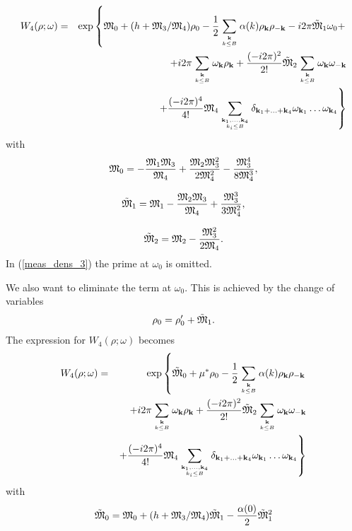 \begin{eqnarray}
	\label{meas_dens_3}
	W_4(\rho;\omega) &=& \exp \left\{\frak M_0 + (h + \frak M_3/\frak M_4)\rho_0
	- \frac12  \sum\limits_{{\vb k}\atop k\le B} \alpha(k) \rho_{\vb k} \rho_{-{\vb k}}
	- i2\pi \tilde{\frak M}_1 \omega_0 + \right.  \nonumber\\
	&&
	+ i2\pi \sum\limits_{{\vb k} \atop k\le B} \omega_{\vb k} \rho_{\vb k}
	+ \frac{(-i2\pi)^2}{2!}\tilde{\frak M}_2 \sum\limits_{{\vb k} \atop k\le B} \omega_{\vb k} \omega_{-\vb k}
	\nonumber\\
	&& \left. +
	\frac{(-i2\pi)^4}{4!} 
	{\frak M}_4
	\sum\limits_{\vb{k}_1,\dotsc,\vb{k}_4\atop{k_i \le B}}
	\delta_{\vb{k}_1 + \dotsc + \vb{k}_4} 
	\omega_{{\vb k}_1} \dots \omega_{{\vb k}_4} \right\}
\end{eqnarray}
with
\begin{equation}
	\label{def:M_0}
	\frak M_0 = -\frac{\frak M_1 \frak M_3}{\frak M_4} + \frac{\frak M_2 \frak M_3^2}{2 \frak M_4^2}
	- \frac{\frak M_3^4}{8\frak M_4^3},
\end{equation}

\begin{equation}
	\label{def:tilde_M_1}
	\tilde{\frak M}_1 = \frak M_1 -\frac{\frak M_2 \frak M_3}{\frak M_4} + \frac{\frak M_3^3}{3\frak M_4^2},
\end{equation}

\begin{equation}
	\label{def:tilde_M_2}
	\tilde{\frak M}_2 = \frak M_2 - \frac{\frak M_3^2}{2 \frak M_4}.
\end{equation}
In (\ref{meas_dens_3}) the prime at $\omega_0$ is omitted.

We also want to eliminate the term at $\omega_0$. This is achieved by the change of variables
\begin{equation}
	\rho_0 = \rho'_0 + \tilde{\frak M}_1.
\end{equation}
The expression for $W_4(\rho; \omega)$ becomes
\begin{eqnarray}
	\label{meas_dens_4}
	W_4(\rho;\omega) &=& \exp \left\{\tilde{\frak M}_0 + \mu^*\rho_0
	- \frac12  \sum\limits_{{\vb k}\atop k\le B} \alpha(k) \rho_{\vb k} \rho_{-{\vb k}} \right.  \nonumber\\
	&&
	+ i2\pi \sum\limits_{{\vb k} \atop k\le B} \omega_{\vb k} \rho_{\vb k}
	+ \frac{(-i2\pi)^2}{2!}\tilde{\frak M}_2 \sum\limits_{{\vb k} \atop k\le B} \omega_{\vb k} \omega_{-\vb k}
	\nonumber\\
	&& \left. +
	\frac{(-i2\pi)^4}{4!} 
	{\frak M}_4
	\sum\limits_{\vb{k}_1,\dotsc,\vb{k}_4\atop{k_i \le B}}
	\delta_{\vb{k}_1 + \dotsc + \vb{k}_4} 
	\omega_{{\vb k}_1} \dots \omega_{{\vb k}_4} \right\}
\end{eqnarray}
with
\begin{equation}
	\label{tilde_frak_M0}
	\tilde{\frak M}_0 = \frak M_0 + (h + {\frak M_3}/{\frak M_4})\tilde{\frak M}_1 - \frac{\alpha(0)}{2}\tilde{\frak M}_1^2
\end{equation}

